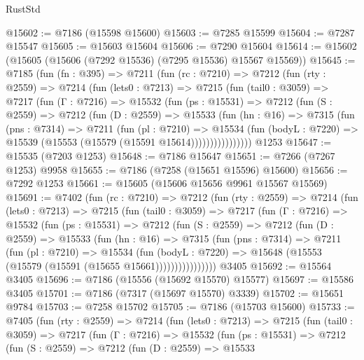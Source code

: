 \begin{lexlean}{RustStd}
\begin{coremodule}
{\begin{coremodule}
{{{{{{{{{{{{{{{{{{{{{{{{{{{{{{{{@15602 := @7186 (@15598 @15600)
@15603 := @7285 @15599
@15604 := @7287 @15547
@15605 := @15603 @15604
@15606 := @7290 @15604
@15614 := @15602 (@15605 (@15606 (@7292 @15536) (@7295 @15536) @15567 @15569))
@15645 := @7185
    (fun (fn : @395) =>
    @7211
      (fun (rc : @7210) =>
      @7212
        (fun (rty : @2559) =>
        @7214
          (fun (lets0 : @7213) =>
          @7215
            (fun (tail0 : @3059) =>
            @7217
              (fun (Γ : @7216) =>
              @15532
                (fun (ps : @15531) =>
                @7212
                  (fun (S : @2559) =>
                  @7212
                    (fun (D : @2559) =>
                    @15533
                      (fun (hn : @16) =>
                      @7315
                        (fun (pns : @7314) =>
                        @7211
                          (fun (pl : @7210) =>
                          @15534
                            (fun (bodyL : @7220) =>
                            @15539 (@15553 (@15579 (@15591 @15614))))))))))))))))
    @1253
@15647 := @15535 (@7203 @1253)
@15648 := @7186 @15647
@15651 := @7266 (@7267 @1253) @9958
@15655 := @7186 (@7258 (@15651 @15596) @15600)
@15656 := @7292 @1253
@15661 := @15605 (@15606 @15656 @9961 @15567 @15569)
@15691 := @7402
    (fun (rc : @7210) =>
    @7212
      (fun (rty : @2559) =>
      @7214
        (fun (lets0 : @7213) =>
        @7215
          (fun (tail0 : @3059) =>
          @7217
            (fun (Γ : @7216) =>
            @15532
              (fun (ps : @15531) =>
              @7212
                (fun (S : @2559) =>
                @7212
                  (fun (D : @2559) =>
                  @15533
                    (fun (hn : @16) =>
                    @7315
                      (fun (pns : @7314) =>
                      @7211
                        (fun (pl : @7210) =>
                        @15534
                          (fun (bodyL : @7220) =>
                          @15648 (@15553 (@15579 (@15591 (@15655 @15661))))))))))))))))
    @3405
@15692 := @15564 @3405
@15696 := @7186 (@15556 (@15692 @15570) @15577)
@15697 := @15586 @3405
@15701 := @7186 (@7317 (@15697 @15570) @3339)
@15702 := @15651 @9784
@15703 := @7258 @15702
@15705 := @7186 (@15703 @15600)
@15733 := @7405
    (fun (rty : @2559) =>
    @7214
      (fun (lets0 : @7213) =>
      @7215
        (fun (tail0 : @3059) =>
        @7217
          (fun (Γ : @7216) =>
          @15532
            (fun (ps : @15531) =>
            @7212
              (fun (S : @2559) =>
              @7212
                (fun (D : @2559) =>
                @15533
}}}}}}}}}}}}}}}}}}}}}}}}}}}}}}}}
\end{coremodule}}
\end{coremodule}
\end{lexlean}
